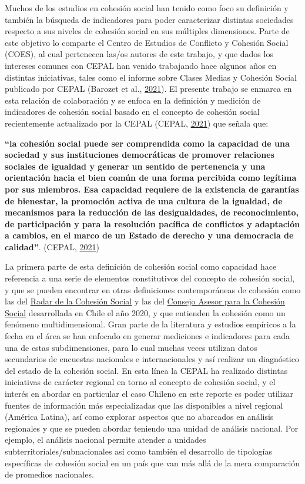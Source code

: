\documentclass[
  12pt,
]{book}
\begin{document}
Muchos de los estudios en cohesión social han tenido como foco su definición y también la búsqueda de indicadores para poder caracterizar distintas sociedades respecto a sus niveles de cohesión social en sus múltiples dimensiones. Parte de este objetivo lo comparte el Centro de Estudios de Conflicto y Cohesión Social (COES), al cual pertenecen las/os autores de este trabajo, y que dados los intereses comunes con CEPAL han venido trabajando hace algunos años en distintas iniciativas, tales como el informe sobre Clases Medias y Cohesión Social publicado por CEPAL (Barozet et al., \protect\hyperlink{ref-barozet_clases_2021}{2021}). El presente trabajo se enmarca en esta relación de colaboración y se enfoca en la definición y medición de indicadores de cohesión social basado en el concepto de cohesión social recientemente actualizado por la CEPAL (CEPAL, \protect\hyperlink{ref-cepal_cohesion_2021}{2021}) que señala que:

\textbf{``la cohesión social puede ser comprendida como la capacidad de una sociedad y sus instituciones democráticas de promover relaciones sociales de igualdad y generar un sentido de pertenencia y una orientación hacia el bien común de una forma percibida como legítima por sus miembros. Esa capacidad requiere de la existencia de garantías de bienestar, la promoción activa de una cultura de la igualdad, de mecanismos para la reducción de las desigualdades, de reconocimiento, de participación y para la resolución pacífica de conflictos y adaptación a cambios, en el marco de un Estado de derecho y una democracia de calidad''}. (CEPAL, \protect\hyperlink{ref-cepal_cohesion_2021}{2021})

La primera parte de esta definición de cohesión social como capacidad hace referencia a una serie de elementos constitutivos del concepto de cohesión social, y que se pueden encontrar en otras definiciones contemporáneas de cohesión como las del \href{https://www.bertelsmann-stiftung.de/en/publications/publication/did/social-cohesion-radar/}{Radar de la Cohesión Social} y las del \href{https://www.desarrollosocialyfamilia.gob.cl/storage/docs/Informe_Final_Consejo_Cohesion_Social.pdf}{Consejo Asesor para la Cohesión Social} desarrollada en Chile el año 2020, y que entienden la cohesión como un fenómeno multidimensional. Gran parte de la literatura y estudios empíricos a la fecha en el área se han enfocado en generar mediciones e indicadores para cada una de estas subdimensiones, para lo cual muchas veces utilizan datos secundarios de encuestas nacionales e internacionales y así realizar un diagnóstico del estado de la cohesión social. En esta línea la CEPAL ha realizado distintas iniciativas de carácter regional en torno al concepto de cohesión social, y el interés en abordar en particular el caso Chileno en este reporte es poder utilizar fuentes de información más especializadas que las disponibles a nivel regional (América Latina), así como explorar aspectos que no abarcados en análisis regionales y que se pueden abordar teniendo una unidad de análisis nacional. Por ejemplo, el análisis nacional permite atender a unidades subterritoriales/subnacionales así como también el desarrollo de tipologías específicas de cohesión social en un país que van más allá de la mera comparación de promedios nacionales.
\end{document}
